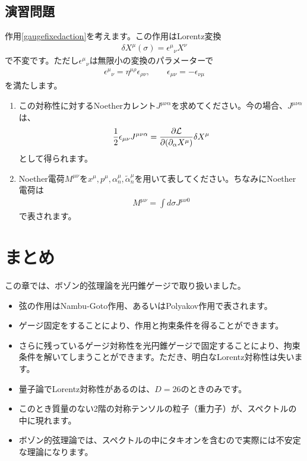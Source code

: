 \documentclass[report,paper=a4, fontsize=12pt, line_length=16cm, number_of_lines=34,dvipdfmx]{jlreq}
\numberwithin{equation}{chapter}
\numberwithin{equation}{section}
\newcommand{\del}{\partial}
\newcommand{\alphat}{\tilde{\alpha}}
\newcommand{\Lcal}{\mathcal{L}}
\begin{document}
\subsection*{演習問題}
作用\eqref{gaugefixedaction}を考えます。この作用はLorentz変換
\begin{align}
  \delta X^{\mu}(\sigma)=\epsilon^{\mu}{}_{\nu}X^{\nu}
\end{align}
で不変です。ただし$\epsilon^{\mu}{}_{\nu}$は無限小の変換のパラメーターで
\begin{align}
  \epsilon^{\mu}{}_{\nu}=\eta^{\mu\rho}\epsilon_{\rho\nu},\qquad \epsilon_{\mu\nu}=-\epsilon_{\nu\mu}
\end{align}
を満たします。
\begin{enumerate}
\item この対称性に対するNoetherカレント$J^{\mu\nu\alpha}$を求めてください。今の場合、$J^{\mu\nu\alpha}$は、
\begin{align}
  \frac12 \epsilon_{\mu\nu}J^{\mu\nu\alpha}=\pdv{\Lcal}{(\del_{\alpha}X^{\mu})}\delta X^{\mu}
\end{align}
として得られます。
\item Noether電荷$M^{\mu\nu}$を$x^{\mu},p^{\mu},\alpha^{\mu}_{n},\alphat^{\mu}_{n}$を用いて表してください。ちなみにNoether電荷は
\begin{align}
  M^{\mu\nu}=\int d\sigma J^{\mu\nu 0}
\end{align}
で表されます。
\end{enumerate}


\section{まとめ}
この章では、ボゾン的弦理論を光円錐ゲージで取り扱いました。
\begin{itemize}
  \item 弦の作用はNambu-Goto作用、あるいはPolyakov作用で表されます。
  \item ゲージ固定をすることにより、作用と拘束条件を得ることができます。
  \item さらに残っているゲージ対称性を光円錐ゲージで固定することにより、拘束条件を解いてしまうことができます。ただき、明白なLorentz対称性は失います。
  \item 量子論でLorentz対称性があるのは、$D=26$のときのみです。
  \item このとき質量のない2階の対称テンソルの粒子（重力子）が、スペクトルの中に現れます。
  \item ボゾン的弦理論では、スペクトルの中にタキオンを含むので実際には不安定な理論になります。
\end{itemize}
\end{document}

